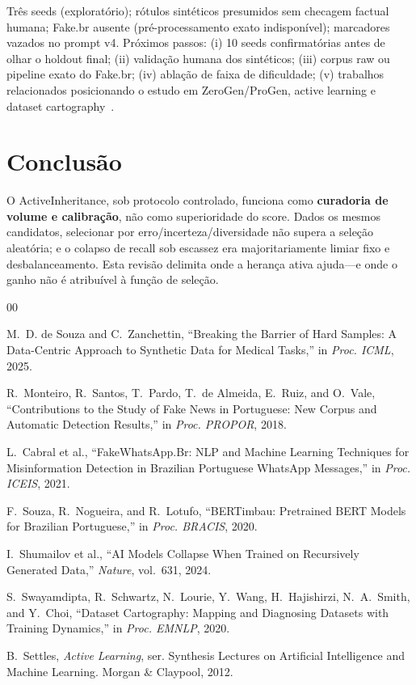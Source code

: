 \documentclass[conference]{IEEEtran}
\begin{document}
Três seeds (exploratório); rótulos sintéticos presumidos sem checagem factual humana; Fake.br ausente (pré-processamento exato indisponível); marcadores vazados no prompt v4. Próximos passos: (i) 10 seeds confirmatórias antes de olhar o holdout final; (ii) validação humana dos sintéticos; (iii) corpus raw ou pipeline exato do Fake.br; (iv) ablação de faixa de dificuldade; (v) trabalhos relacionados posicionando o estudo em ZeroGen/ProGen, active learning e dataset cartography~\cite{swayamdipta2020,settles2012}.

\section{Conclusão}

O ActiveInheritance, sob protocolo controlado, funciona como \textbf{curadoria de volume e calibração}, não como superioridade do score. Dados os mesmos candidatos, selecionar por erro/incerteza/diversidade não supera a seleção aleatória; e o colapso de recall sob escassez era majoritariamente limiar fixo e desbalanceamento. Esta revisão delimita onde a herança ativa ajuda---e onde o ganho não é atribuível à função de seleção.

\balance
\footnotesize
\begin{thebibliography}{00}

M.~D. de Souza and C.~Zanchettin, ``Breaking the Barrier of Hard Samples: A Data-Centric Approach to Synthetic Data for Medical Tasks,'' in \emph{Proc. ICML}, 2025.

R.~Monteiro, R.~Santos, T.~Pardo, T.~de Almeida, E.~Ruiz, and O.~Vale, ``Contributions to the Study of Fake News in Portuguese: New Corpus and Automatic Detection Results,'' in \emph{Proc. PROPOR}, 2018.

L.~Cabral et al., ``FakeWhatsApp.Br: NLP and Machine Learning Techniques for Misinformation Detection in Brazilian Portuguese WhatsApp Messages,'' in \emph{Proc. ICEIS}, 2021.

F.~Souza, R.~Nogueira, and R.~Lotufo, ``BERTimbau: Pretrained BERT Models for Brazilian Portuguese,'' in \emph{Proc. BRACIS}, 2020.

I.~Shumailov et al., ``AI Models Collapse When Trained on Recursively Generated Data,'' \emph{Nature}, vol.~631, 2024.

S.~Swayamdipta, R.~Schwartz, N.~Lourie, Y.~Wang, H.~Hajishirzi, N.~A.~Smith, and Y.~Choi, ``Dataset Cartography: Mapping and Diagnosing Datasets with Training Dynamics,'' in \emph{Proc. EMNLP}, 2020.

B.~Settles, \emph{Active Learning}, ser. Synthesis Lectures on Artificial Intelligence and Machine Learning. Morgan \& Claypool, 2012.


\end{thebibliography}
\end{document}
